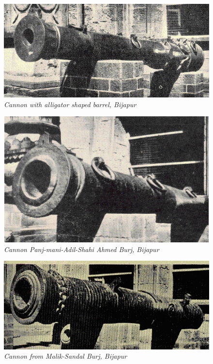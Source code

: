 \vspace{-.6cm}

\begin{figure}[H]
\includegraphics[scale=4.1]{images/chapter-5/Fig35.jpg}

\vspace{-.2cm}

\caption{\textit{Cannon with alligator shaped barrel, Bijapur}}\label{chapter-5-fig35}
\end{figure}

\vspace{-.3cm}

\begin{figure}[H]
\includegraphics[scale=2]{images/chapter-5/Fig36.jpg}
\caption{\textit{Cannon Panj-mani-Adil-Shahi Ahmed Burj, Bijapur}}\label{chapter-5-fig36}
\end{figure}



\begin{figure}[H]
\includegraphics[scale=2.5]{images/chapter-5/Fig37.jpg}
\caption{\textit{Cannon from Malik-Sandal Burj, Bijapur}}\label{chapter-5-fig37}
\end{figure}

